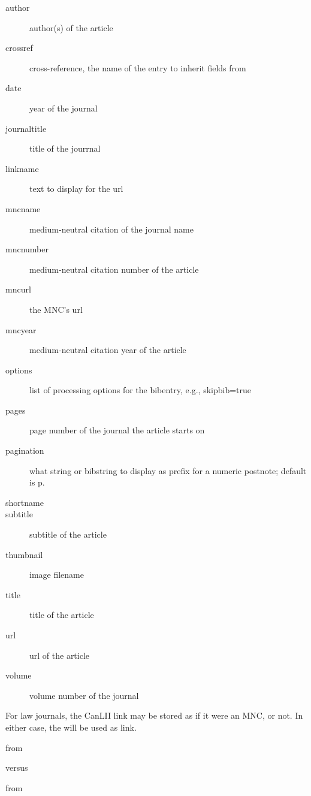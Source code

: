 \begin{description}
\item[author]author(s) of the article
\item[crossref]cross-reference, the name of the entry to inherit fields from
\item[date]year of the journal
\item[journaltitle]title of the jourrnal
\item[linkname]text to display for the url
\item[mncname]medium-neutral citation of the journal name
\item[mncnumber]medium-neutral citation number of the article
\item[mncurl]the MNC’s url
\item[mncyear]medium-neutral citation year of the article
\item[options]list of processing options for the bibentry, e.g., skipbib=true
\item[pages]page number of the journal the article starts on
\item[pagination]what string or bibstring to display as prefix for a numeric postnote; default is p.
\item[shortname] 
\item[subtitle]subtitle of the article
\item[thumbnail]image filename
\item[title]title of the article
\item[url]url of the article
\item[volume]volume number of the journal
\end{description}

\p For law journals, the CanLII link may be stored as if it were an MNC, or not. In either case, the  will be used as link.

\begin{quotation}
\noindent{}
\end{quotation}
from


\colorbox{blue!12}{\begin{minipage}{\textwidth}\end{minipage}}

versus
\begin{quotation}
\noindent{}
\end{quotation}
from

\colorbox{blue!12}{\begin{minipage}{\textwidth}\end{minipage}}

